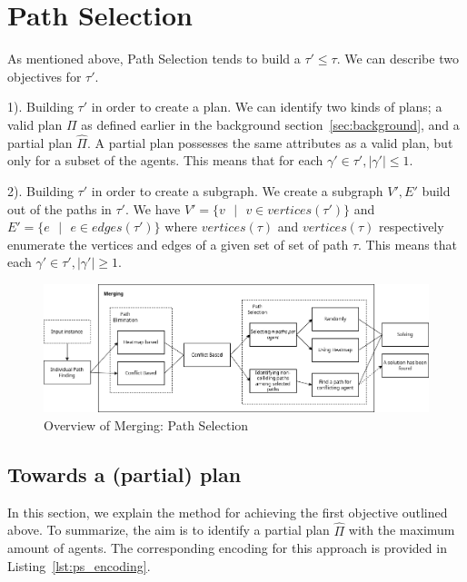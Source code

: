 \section{Path Selection}\label{sec:ps}

As mentioned above, Path Selection tends to build a \(\tau' \leq \tau\). We can describe two objectives for \(\tau'\).  

1). Building \(\tau'\) in order to create a plan. We can identify two kinds of plans; a valid plan \(\Pi\) as defined earlier in the background section~\ref{sec:background}, and a partial plan \(\hat{\Pi}\). A partial plan possesses the same attributes as a valid plan, but only for a subset of the agents. This means that  for each \(\gamma' \in \tau', |\gamma'| \leq 1\). 

2). Building \(\tau'\) in order to create a subgraph. We create a subgraph \(V',E'\) build out of the paths in \(\tau'\). We have 
\(V' = \{v \text{ }|\text{ } v \in vertices(\tau')\} \)  and \(E' = \{e \text{ }|\text{ } e \in edges(\tau')  \} \) where \(vertices(\tau)\) and \(vertices(\tau)\) respectively enumerate the vertices and edges of a given set of set of path \(\tau\). This means that  each \(\gamma' \in \tau', |\gamma'|  \geq 1 \). 


\begin{figure}[H]
    \centering
    \caption{Overview of Merging: Path Selection}\label{fig:overview_merging_path_selection}
    \includegraphics[width=\widthimg]{img/overview_merging_path_selection.drawio.png}
\end{figure}



\subsection{Towards a (partial) plan}

In this section, we explain the method for achieving the first objective outlined above. To summarize, the aim is to identify a partial plan \(\hat{\Pi}\) with the maximum amount of agents.  The corresponding encoding for this approach is provided in Listing~\ref{lst:ps_encoding}.

